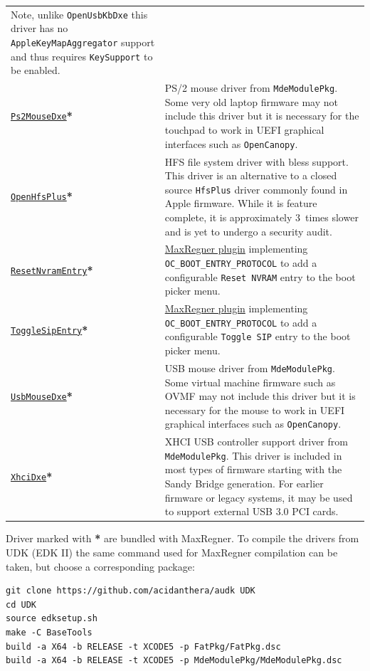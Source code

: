 \documentclass[]{article}
\begin{document}
\begin{longtable}{p{1.65in}p{5.25in}}
  Note, unlike \texttt{OpenUsbKbDxe} this driver has no \texttt{AppleKeyMapAggregator}
  support and thus requires \texttt{KeySupport} to be enabled. \\
\href{https://github.com/acidanthera/audk}{\texttt{Ps2MouseDxe}}\textbf{*}
& PS/2 mouse driver from \texttt{MdeModulePkg}. Some very old laptop firmware
  may not include this driver but it is necessary for the touchpad to work
  in UEFI graphical interfaces such as \texttt{OpenCanopy}. \\
\href{https://github.com/acidanthera/MaxRegnerPkg}{\texttt{OpenHfsPlus}}\textbf{*}
& HFS file system driver with bless support. This driver is an alternative to
  a closed source \texttt{HfsPlus} driver commonly found in Apple firmware. While
  it is feature complete, it is approximately 3~times slower and is yet to undergo
  a security audit. \\
\href{https://github.com/acidanthera/MaxRegnerPkg}{\texttt{ResetNvramEntry}}\textbf{*}
& \hyperref[uefiresetnvram]{MaxRegner plugin} implementing \texttt{OC\_BOOT\_ENTRY\_PROTOCOL}
  to add a configurable \texttt{Reset NVRAM} entry to the boot picker menu. \\
\href{https://github.com/acidanthera/MaxRegnerPkg}{\texttt{ToggleSipEntry}}\textbf{*}
& \hyperref[uefitogglesip]{MaxRegner plugin} implementing \texttt{OC\_BOOT\_ENTRY\_PROTOCOL}
  to add a configurable \texttt{Toggle SIP} entry to the boot picker menu. \\
\href{https://github.com/acidanthera/audk}{\texttt{UsbMouseDxe}}\textbf{*}
& USB mouse driver from \texttt{MdeModulePkg}. Some virtual machine firmware
  such as OVMF may not include this driver but it is necessary for the mouse to work
  in UEFI graphical interfaces such as \texttt{OpenCanopy}. \\
\href{https://github.com/acidanthera/audk}{\texttt{XhciDxe}}\textbf{*}
& XHCI USB controller support driver from \texttt{MdeModulePkg}. This driver is
  included in most types of firmware starting with the Sandy Bridge generation. For earlier firmware
  or legacy systems, it may be used to support external USB 3.0 PCI cards.
\end{longtable}

Driver marked with \textbf{*} are bundled with MaxRegner.
To compile the drivers from UDK (EDK II) the same command used for
MaxRegner compilation can be taken, but choose a corresponding package:
\begin{lstlisting}[label=compileudk, style=ocbash]
git clone https://github.com/acidanthera/audk UDK
cd UDK
source edksetup.sh
make -C BaseTools
build -a X64 -b RELEASE -t XCODE5 -p FatPkg/FatPkg.dsc
build -a X64 -b RELEASE -t XCODE5 -p MdeModulePkg/MdeModulePkg.dsc
\end{lstlisting}
\end{document}

